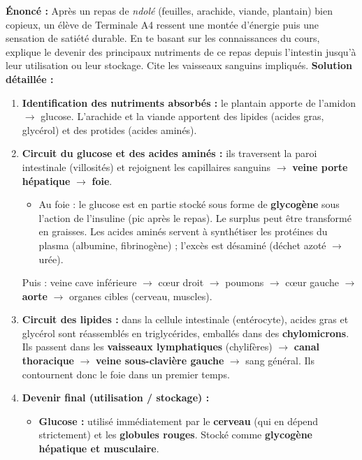 \documentclass[11pt]{article}
\newcommand{\cle}[1]{{\popxbold\color{popdark}#1}}
\begin{document}
\begin{exoresolu}
    \textbf{Énoncé :} Après un repas de \emph{ndolé} (feuilles, arachide, viande, plantain) bien copieux, un élève de Terminale A4 ressent une montée d'énergie puis une sensation de satiété durable. En te basant sur les connaissances du cours, explique le devenir des principaux nutriments de ce repas depuis l'intestin jusqu'à leur utilisation ou leur stockage. Cite les vaisseaux sanguins impliqués.
    \tcblower
    \textbf{Solution détaillée :}
    \begin{enumerate}
        \item \textbf{Identification des nutriments absorbés :} le plantain apporte de l'amidon $\rightarrow$ \cle{glucose}. L'arachide et la viande apportent des \cle{lipides} (acides gras, glycérol) et des \cle{protides} (acides aminés).
        \item \textbf{Circuit du glucose et des acides aminés :} ils traversent la paroi intestinale (villosités) et rejoignent les capillaires sanguins $\rightarrow$ \textbf{veine porte hépatique} $\rightarrow$ \textbf{foie}.
            \begin{itemize}
                \item Au foie : le glucose est en partie stocké sous forme de \textbf{glycogène} sous l'action de l'insuline (pic après le repas). Le surplus peut être transformé en graisses. Les acides aminés servent à synthétiser les protéines du plasma (albumine, fibrinogène) ; l'excès est désaminé (déchet azoté $\rightarrow$ urée).
            \end{itemize}
            Puis : veine cave inférieure $\rightarrow$ cœur droit $\rightarrow$ poumons $\rightarrow$ cœur gauche $\rightarrow$ \textbf{aorte} $\rightarrow$ organes cibles (cerveau, muscles).
        \item \textbf{Circuit des lipides :} dans la cellule intestinale (entérocyte), acides gras et glycérol sont réassemblés en \cle{triglycérides}, emballés dans des \textbf{chylomicrons}. Ils passent dans les \textbf{vaisseaux lymphatiques} (chylifères) $\rightarrow$ \textbf{canal thoracique} $\rightarrow$ \textbf{veine sous-clavière gauche} $\rightarrow$ sang général. Ils contournent donc le foie dans un premier temps.
        \item \textbf{Devenir final (utilisation / stockage) :}
            \begin{itemize}
                \item \textbf{Glucose :} utilisé immédiatement par le \textbf{cerveau} (qui en dépend strictement) et les \textbf{globules rouges}. Stocké comme \textbf{glycogène hépatique et musculaire}.

\end{itemize}
\end{enumerate}
\end{exoresolu}
\end{document}
